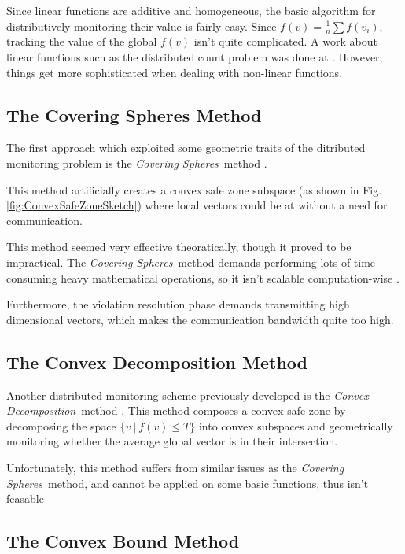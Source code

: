 \documentclass[11pt, conference]{article}
\newcommand{\coveringSpheres}{\textit{Covering Spheres}}
\newcommand{\convexDecomposition}{\textit{Convex Decomposition}}
\begin{document}
Since linear functions are additive and homogeneous, the basic algorithm for distributively monitoring their value is fairly easy. Since ${f(v) = \frac{1}{n}\sum f(v_i)}$, tracking the value of the global $f(v)$ isn't quite complicated. A work about linear functions such as the distributed count problem was done at \cite{keralapura2006communication}. However, things get more sophisticated when dealing with non-linear functions.

\subsection{The Covering Spheres Method}

The first approach which exploited some geometric traits of the ditributed monitoring problem is the \coveringSpheres \ method \cite{sharfman2007geometric}.

This method artificially creates a convex safe zone subspace (as shown in Fig. \ref{fig:ConvexSafeZoneSketch}) where local vectors could be at without a need for communication.

This method seemed very effective theoratically, though it proved to be impractical. The \coveringSpheres \ method demands performing lots of time consuming heavy mathematical operations, so it isn't scalable computation-wise \cite{lazerson2018lightweight}.

Furthermore, the violation resolution phase demands transmitting high dimensional vectors, which makes the communication bandwidth quite too high.

\subsection{The Convex Decomposition Method}

Another distributed monitoring scheme previously developed is the \convexDecomposition \ method \cite{lazerson2015monitoring}. This method composes a convex safe zone by decomposing the space ${\{v \ | \ f(v) \leq T\}}$ into convex subspaces and geometrically monitoring whether the average global vector is in their intersection.

Unfortunately, this method suffers from similar issues as the \coveringSpheres \ method, and cannot be applied on some basic functions, thus isn't feasable \cite{lazerson2018lightweight}

\subsection{The Convex Bound Method}
\end{document}
